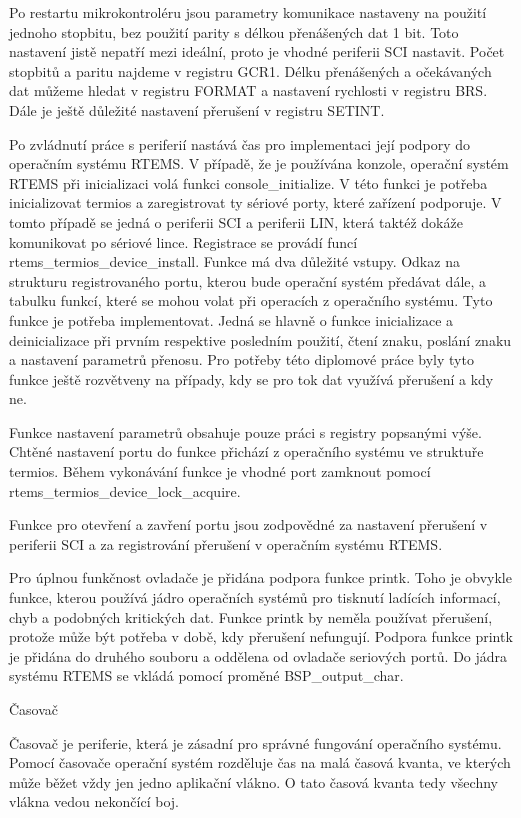 Po restartu mikrokontroléru jsou parametry komunikace nastaveny na použití jednoho stopbitu, bez použití parity s délkou přenášených dat 1 bit. Toto nastavení jistě nepatří mezi ideální, proto je vhodné periferii SCI nastavit. Počet stopbitů a paritu najdeme v registru GCR1. Délku přenášených a očekávaných dat můžeme hledat v registru FORMAT a nastavení rychlosti v registru BRS. Dále je ještě důležité nastavení přerušení v registru SETINT.

Po zvládnutí práce s periferií nastává čas pro implementaci její podpory do operačním systému RTEMS. V případě, že je používána konzole, operační systém RTEMS při inicializaci volá funkci console\_initialize. V této funkci je potřeba inicializovat termios a zaregistrovat ty sériové porty, které zařízení podporuje. V tomto případě se jedná o periferii SCI a periferii LIN, která taktéž dokáže komunikovat po sériové lince. Registrace se provádí funcí rtems\_termios\_device\_install. Funkce má dva důležité vstupy. Odkaz na strukturu registrovaného portu, kterou bude operační systém předávat dále, a tabulku funkcí, které se mohou volat při operacích z operačního systému. Tyto funkce je potřeba implementovat. Jedná se hlavně o funkce inicializace a deinicializace při prvním respektive posledním použití, čtení znaku, poslání znaku a nastavení parametrů přenosu. Pro potřeby této diplomové práce byly tyto funkce ještě rozvětveny na případy, kdy se pro tok dat využívá přerušení a kdy ne.

Funkce nastavení parametrů obsahuje pouze práci s registry popsanými výše. Chtěné nastavení portu do funkce přichází z operačního systému ve struktuře termios. Během vykonávání funkce je vhodné port zamknout pomocí rtems\_termios\_device\_lock\_acquire.

Funkce pro otevření a zavření portu jsou zodpovědné za nastavení přerušení v periferii SCI a za registrování přerušení v operačním systému RTEMS.

Pro úplnou funkčnost ovladače je přidána podpora funkce printk. Toho je obvykle funkce, kterou používá jádro operačních systémů pro tisknutí ladících informací, chyb a podobných kritických dat. Funkce printk by neměla používat přerušení, protože může být potřeba v době, kdy přerušení nefungují. Podpora funkce printk je přidána do druhého souboru a oddělena od ovladače seriových portů. Do jádra systému RTEMS se vkládá pomocí proměné BSP\_output\_char.

\secc        Časovač

	Časovač je periferie, která je zásadní pro správné fungování operačního systému. Pomocí časovače operační systém rozděluje čas na malá časová kvanta, ve kterých může běžet vždy jen jedno aplikační vlákno. O tato časová kvanta tedy všechny vlákna vedou nekončící boj.

